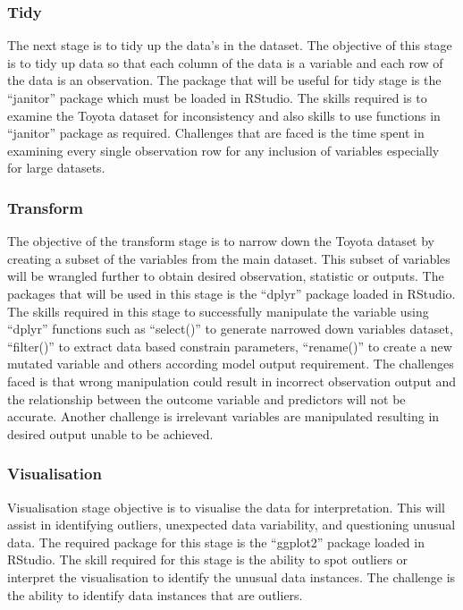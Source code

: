 \documentclass[
]{article}
\begin{document}
\hypertarget{tidy}{%
\subsubsection{Tidy}\label{tidy}}

The next stage is to tidy up the data's in the dataset. The objective of
this stage is to tidy up data so that each column of the data is a
variable and each row of the data is an observation. The package that
will be useful for tidy stage is the ``janitor'' package which must be
loaded in RStudio. The skills required is to examine the Toyota dataset
for inconsistency and also skills to use functions in ``janitor''
package as required. Challenges that are faced is the time spent in
examining every single observation row for any inclusion of variables
especially for large datasets.

\hypertarget{transform}{%
\subsubsection{Transform}\label{transform}}

The objective of the transform stage is to narrow down the Toyota
dataset by creating a subset of the variables from the main dataset.
This subset of variables will be wrangled further to obtain desired
observation, statistic or outputs. The packages that will be used in
this stage is the ``dplyr'' package loaded in RStudio. The skills
required in this stage to successfully manipulate the variable using
``dplyr'' functions such as ``select()'' to generate narrowed down
variables dataset, ``filter()'' to extract data based constrain
parameters, ``rename()'' to create a new mutated variable and others
according model output requirement. The challenges faced is that wrong
manipulation could result in incorrect observation output and the
relationship between the outcome variable and predictors will not be
accurate. Another challenge is irrelevant variables are manipulated
resulting in desired output unable to be achieved.

\hypertarget{visualisation}{%
\subsubsection{Visualisation}\label{visualisation}}

Visualisation stage objective is to visualise the data for
interpretation. This will assist in identifying outliers, unexpected
data variability, and questioning unusual data. The required package for
this stage is the ``ggplot2'' package loaded in RStudio. The skill
required for this stage is the ability to spot outliers or interpret the
visualisation to identify the unusual data instances. The challenge is
the ability to identify data instances that are outliers.
\end{document}
